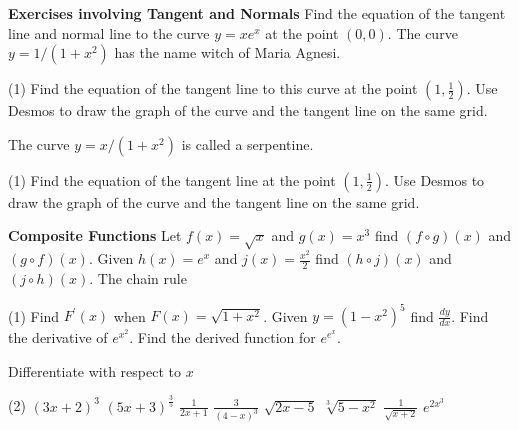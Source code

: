 \begin{Exercise}[title={Product, Quotient, \& Chain Rules},label=exPQCRules]
{\hspace{-0.6cm}\textbf{Exercises involving Tangent and Normals}}
	\Question Find the equation of the tangent line and normal line to the curve $y =x e^{x}$ at the point $\left (0 ,0\right )$. %
	\Question The curve $y =1/(1 +x^{2})$ has the name witch of Maria Agnesi.
\begin{tasks}(1)
	\task  Find the equation of the tangent line to this curve at the point
	$\left (1 ,\frac{1}{2}\right )$.%
	\task  Use Desmos to draw the graph of the curve and the tangent line on the same grid.
\end{tasks}
	\Question The curve $y =x/(1 +x^{2})$ is called a serpentine. 
\begin{tasks}(1)
	\task  Find the equation of the tangent line at the point $\left (1 ,\frac{1}{2}\right )$.%
	\task  Use Desmos to draw the graph of the curve and the tangent line on the same grid.
\end{tasks}

{\hspace{-0.6cm}\textbf{Composite Functions}}
\Question Let $f (x) =\sqrt{x}$ and $g (x) =x^{3}$ find $\left (f \circ g\right ) (x)$ and $\left (g \circ f\right ) \left (x\right )$. %
\Question Given $h \left (x\right ) =e^{x}$ and $j (x) =\frac{x^{2}}{2}$ find $\left (h \circ j\right ) (x)$ and $\left (j \circ h\right ) (x)$. %
	\Question The chain rule
\begin{tasks}(1)
	\task Find $F^{ \prime } (x)$ when $F (x) =\sqrt{1 +x^{2}}$. %
	\task Given $y =\left (1 -x^{2}\right )^{5}$ find $\frac{d y}{d x}$. %
	\task Find the derivative of $e^{x^{2}}$. %
	\task Find the derived function for $e^{e^{x}}$. %
\end{tasks}

	\Question Differentiate with respect to $x$
\begin{tasks}(2)
	\task $\left (3 x +2\right )^{3}$ %
	\task $\left (5 x +3\right )^{\frac{3}{5}}$%
	\task $\frac{1}{2 x +1}$%
	\task $\frac{3}{\left (4 -x\right )^{3}}$ %
	\task $\sqrt{2 x -5}$ %
	\task $\sqrt[{3}]{5 -x^{2}}$%
	\task $\frac{1}{\sqrt{x +2}}$ %
	\task $e^{2 x^{3}}$ %
\end{tasks}


\end{Exercise}
